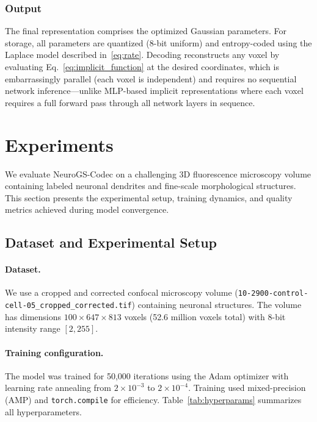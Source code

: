 \documentclass[11pt,a4paper]{article}
\begin{document}
\subsubsection{Output}

The final representation comprises the optimized Gaussian parameters.  For storage, all parameters are quantized (8-bit uniform) and entropy-coded using the Laplace model described in~\eqref{eq:rate}.  Decoding reconstructs any voxel by evaluating Eq.~\eqref{eq:implicit_function} at the desired coordinates, which is embarrassingly parallel (each voxel is independent) and requires no sequential network inference---unlike MLP-based implicit representations where each voxel requires a full forward pass through all network layers in sequence.

\section{Experiments}
\label{sec:experiments}

We evaluate NeuroGS-Codec on a challenging 3D fluorescence microscopy volume containing labeled neuronal dendrites and fine-scale morphological structures. This section presents the experimental setup, training dynamics, and quality metrics achieved during model convergence.

\subsection{Dataset and Experimental Setup}
\label{subsec:dataset}

\paragraph{Dataset.}
We use a cropped and corrected confocal microscopy volume (\texttt{10-2900-control-cell-05\_cropped\_corrected.tif}) containing neuronal structures. The volume has dimensions $100 \times 647 \times 813$ voxels (52.6 million voxels total) with 8-bit intensity range $[2, 255]$.

\paragraph{Training configuration.}
The model was trained for 50,000 iterations using the Adam optimizer with learning rate annealing from $2 \times 10^{-3}$ to $2 \times 10^{-4}$. Training used mixed-precision (AMP) and \texttt{torch.compile} for efficiency. Table~\ref{tab:hyperparams} summarizes all hyperparameters.
\end{document}
